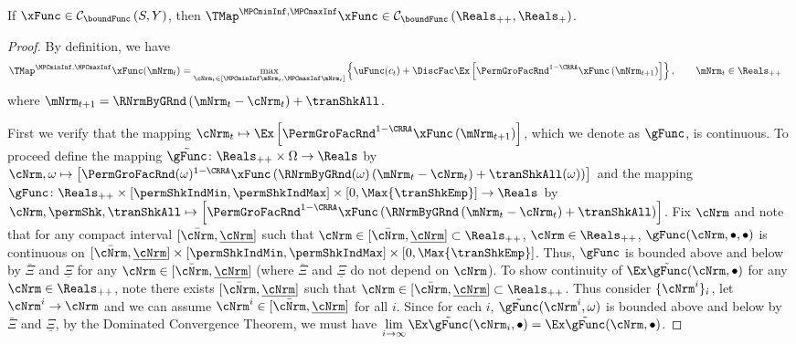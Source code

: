\documentclass[\econtexRoot/BufferStockTheory]{subfiles}
\begin{document}
\begin{claim}\label{clm:hiraguchi_cont}
If $\xFunc\in  \mathcal{C}_{\boundFunc }\left( S,Y\right)$, then $\TMap^{\MPCminInf, \MPCmaxInf}{\mathfrak{\xFunc}}\in \mathcal{C}_{\boundFunc }\left(\Reals_{++}, \Reals_{+}\right)$. 
\end{claim}
%
\begin{proof}
By definition, we have
%
\begin{align}
  \TMap^{\MPCminInf, \MPCmaxInf}{\mathfrak{\xFunc}}(\mNrm_{t}) & = \underset{\cNrm_{t} \in
                                            [\MPCminInf \mNrm_{t}, \MPCmaxInf \mNrm_{t}]
                                            }\max \left\{
                                            \uFunc(c_{t})+\DiscFac \Ex\left[ {\PermGroFacRnd}^{1-\CRRA }{\mathfrak{\xFunc}}
                                            \left( {\mNrm}_{t+1}\right) \right] \right\}, \qquad \mNrm_{t}\in \Reals_{++}  %
\end{align}
%
where ${\mNrm}_{t+1} = \RNrmByGRnd\left(\mNrm_{t} - \cNrm_{t}\right) + \tranShkAll$.

First we verify that the mapping $\cNrm_{t}\mapsto \Ex\left[ {\PermGroFacRnd}^{1-\CRRA }{\mathfrak{\xFunc}}
                                            \left( {\mNrm}_{t+1}\right) \right]$, which we denote as $\gFunc$,  is continuous. To proceed define the mapping $\tilde{\gFunc}\colon \Reals_{++}\times\Omega\rightarrow \Reals$ by $\cNrm, \omega \mapsto\left[ {\PermGroFacRnd}(\omega)^{1-\CRRA }{\mathfrak{\xFunc}}
                                            \left( \RNrmByGRnd(\omega)\left(\mNrm_{t} - \cNrm_{t}\right) + \tranShkAll(\omega)\right) \right]$ and the mapping $\gFunc\colon \Reals_{++}\times[\permShkIndMin,\permShkIndMax]\times [0,\Max{\tranShkEmp}] \rightarrow \Reals$ by $\cNrm, \permShk,\tranShkAll \mapsto\left[ {\PermGroFacRnd}^{1-\CRRA }{\mathfrak{\xFunc}}
                                            \left( \RNrmByGRnd\left(\mNrm_{t} - \cNrm_{t}\right) + \tranShkAll\right) \right]$. Fix $\cNrm$ and note that for any compact interval $[\bar{\cNrm},\underline{\cNrm}]$ such that $\cNrm\in [\bar{\cNrm},\underline{\cNrm}]\subset \Reals_{++}$, $\cNrm\in \Reals_{++}$, $\gFunc(\cNrm,\bullet,\bullet)$ is continuous on $[\bar{\cNrm},\underline{\cNrm}]\times[\permShkIndMin,\permShkIndMax]\times [0,\Max{\tranShkEmp}]$. Thus, $\gFunc$ is bounded above and below by $\bar{\Xi}$ and $\underline{\Xi}$ for any $\cNrm\in [\bar{\cNrm},\underline{\cNrm}]$ (where $\bar{\Xi}$ and $\underline{\Xi}$ do not depend on $\cNrm$). To show continuity of $\Ex \tilde{\gFunc}(\cNrm,\bullet)$ for any $\cNrm \in \Reals_{++}$, note there exists  $[\bar{\cNrm},\underline{\cNrm}]$ such that $\cNrm\in [\bar{\cNrm},\underline{\cNrm}]\subset \Reals_{++}$. Thus consider $\{\cNrm^{i}\}_{i}$, let $\cNrm^{i}\rightarrow \cNrm$ and we can assume $\cNrm^{i}\in [\bar{\cNrm},\underline{\cNrm}]$ for all $i$. Since for each $i$, $\tilde{\gFunc}(\cNrm^{i},\omega)$ is bounded above and below by $\bar{\Xi}$ and $\underline{\Xi}$, by the Dominated Convergence Theorem, we must have $\lim\limits_{i\rightarrow \infty}\Ex \tilde{\gFunc}(\cNrm_{i},\bullet) = \Ex \tilde{\gFunc}(\cNrm,\bullet)$. 
                                            

\end{proof}
\end{document}
